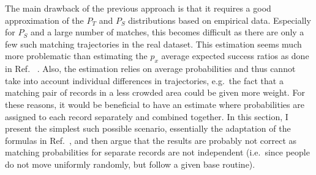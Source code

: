 \documentclass[a4paper]{article}
\begin{document}
		The main drawback of the previous approach is that it requires a good approximation of the $P_T$ and $P_S$ distributions based on empirical
		data. Especially for $P_S$ and a large number of matches, this becomes difficult as there are only a few such matching trajectories in the
		real dataset. This estimation seems much more problematic than estimating the $p_x$ average expected success ratios as done in Ref.~%
		\cite{matchingpaper}. Also, the estimation relies on average probabilities and thus cannot take into account individual differences in
		trajectories, e.g.~the fact that a matching pair of records in a less crowded area could be given more weight. For these reasons, it would be
		beneficial to have an estimate where probabilities are assigned to each record separately and combined together. In this section, I present
		the simplest such possible scenario, essentially the adaptation of the formulas in Ref.~\cite{Juhasz}, and then argue that the results are
		probably not correct as matching probabilities for separate records are not independent (i.e.~since people do not move uniformly randomly, but
		follow a given base routine).
		
\end{document}
